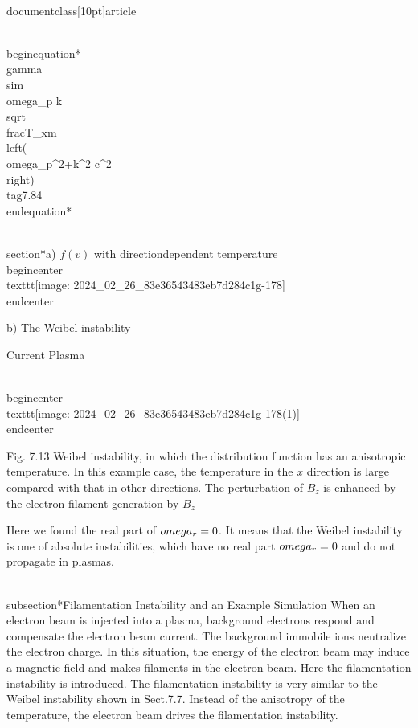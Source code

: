\\documentclass[10pt]{article}
\begin{document}
{{{{\\begin{equation*}
\\gamma \\sim \\omega_{p} k \\sqrt{\\frac{T_{x}}{m\\left(\\omega_{p}^{2}+k^{2} c^{2}\\right)}} \\tag{7.84}
\\end{equation*}


\\section*{a) $f(v)$ with directiondependent temperature}
\\begin{center}
\\texttt{[image: 2024\_02\_26\_83e36543483eb7d284c1g-178]}
\\end{center}

b) The Weibel instability

Current Plasma

\\begin{center}
\\texttt{[image: 2024\_02\_26\_83e36543483eb7d284c1g-178(1)]}
\\end{center}

Fig. 7.13 Weibel instability, in which the distribution function has an anisotropic temperature. In this example case, the temperature in the $x$ direction is large compared with that in other directions. The perturbation of $B_{z}$ is enhanced by the electron filament generation by $B_{z}$

Here we found the real part of $\\omega_{r}=0$. It means that the Weibel instability is one of absolute instabilities, which have no real part $\\omega_{r}=0$ and do not propagate in plasmas.

\\subsection*{Filamentation Instability and an Example Simulation}
When an electron beam is injected into a plasma, background electrons respond and compensate the electron beam current. The background immobile ions neutralize the electron charge. In this situation, the energy of the electron beam may induce a magnetic field and makes filaments in the electron beam. Here the filamentation instability is introduced. The filamentation instability is very similar to the Weibel instability shown in Sect.7.7. Instead of the anisotropy of the temperature, the electron beam drives the filamentation instability.

}}}}
\end{document}
